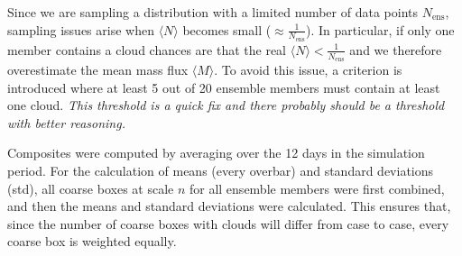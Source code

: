 \documentclass[a4paper, 12pt]{article}
\begin{document}
Since we are sampling a distribution with a limited number of data points $N_{\mathrm{ens}}$, sampling issues arise when $\langle N \rangle$ becomes small ($\approx \frac{1}{N_{\mathrm{ens}}}$). In particular, if only one member contains a cloud chances are that the real $\langle N \rangle < \frac{1}{N_{\mathrm{ens}}}$ and we therefore overestimate the mean mass flux $\langle M \rangle$. To avoid this issue, a criterion is introduced where at least 5 out of 20 ensemble members must contain at least one cloud. \textit{This threshold is a quick fix and there probably should be a threshold with better reasoning.}

Composites were computed by averaging over the 12 days in the simulation period. For the calculation of means (every overbar) and standard deviations (std), all coarse boxes at scale $n$ for all ensemble members were first combined, and then the means and standard deviations were calculated. This ensures that, since the number of coarse boxes with clouds will differ from case to case, every coarse box is weighted equally.
\end{document}
